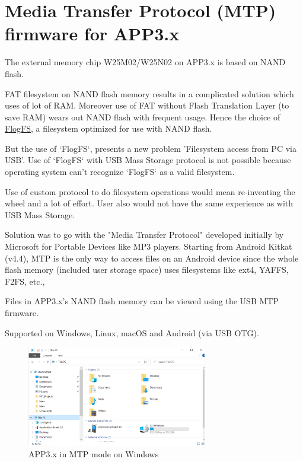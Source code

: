 \documentclass{article}
\begin{document}
\section{Media Transfer Protocol (MTP) firmware for APP3.x}

The external memory chip W25M02/W25N02 on APP3.x is based on NAND flash.

FAT filesystem on NAND flash memory results in a complicated solution which uses of lot of RAM. Moreover use of FAT without Flash Translation Layer (to save RAM) wears out NAND flash with frequent usage. Hence the choice of \href{https://github.com/conservify/FLogFS}{FlogFS}, a filesystem optimized for use with NAND flash.

But the use of `FlogFS`, presents a new problem 'Filesystem access from PC via USB'. Use of `FlogFS` with USB Mass Storage protocol is not possible because operating system can't recognize `FlogFS` as a valid filesystem.

Use of custom protocol to do filesystem operations would mean re-inventing the wheel and a lot of effort. User also would not have the same experience as with USB Mass Storage.

Solution was to go with the "Media Transfer Protocol" developed initially by Microsoft for Portable Devices like MP3 players. Starting from Android Kitkat (v4.4), MTP is the only way to access files on an Android device since the whole flash memory (included user storage space) uses filesystems like ext4, YAFFS, F2FS, etc.,

Files in APP3.x's NAND flash memory can be viewed using the USB MTP firmware.

Supported on Windows, Linux, macOS and Android (via USB OTG).

\begin{figure}[H]
	\begin{center}
		\includegraphics[width=0.7\textwidth]{coinesAPI_images/MTP_windows.png}
		\caption{APP3.x in MTP mode on Windows}
	\end{center}
\end{figure}
\end{document}
